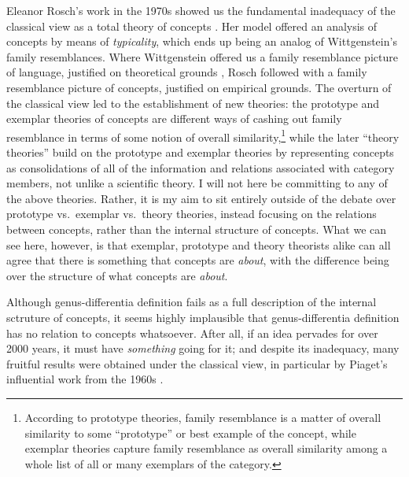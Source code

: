 \documentclass[12pt]{amsart}
\begin{document}
Eleanor Rosch's work in the 1970s showed us the fundamental inadequacy of the classical view as a total theory of concepts \cite{rosch_family_1975} \cite{rosch_structural_1976} \cite{rosch_principles_1978}. Her model offered an analysis of concepts by means of \emph{typicality}, which ends up being an analog of Wittgenstein's family resemblances. Where Wittgenstein offered us a family resemblance picture of language, justified on theoretical grounds \cite{wittgenstein_philosophical_1953}, Rosch followed with a family resemblance picture of concepts, justified on empirical grounds. The overturn of the classical view led to the establishment of new theories: the prototype and exemplar theories of concepts are different ways of cashing out family resemblance in terms of some notion of overall similarity,\footnote{According to prototype theories, family resemblance is a matter of overall similarity to some ``prototype'' or best example of the concept, while exemplar theories capture family resemblance as overall similarity among a whole list of all or many exemplars of the category.} while the later ``theory theories'' build on the prototype and exemplar theories by representing concepts as consolidations of all of the information and relations associated with category members, not unlike a scientific theory. I will not here be committing to any of the above theories. Rather, it is my aim to sit entirely outside of the debate over prototype vs.\ exemplar vs.\ theory theories, instead focusing on the relations between concepts, rather than the internal structure of concepts. What we can see here, however, is that exemplar, prototype and theory theorists alike can all agree that there is something that concepts are \emph{about}, with the difference being over the structure of what concepts are \emph{about}.

Although genus-differentia definition fails as a full description of the internal sctruture of concepts, it seems highly implausible that genus-differentia definition has no relation to concepts whatsoever. After all, if an idea pervades for over 2000 years, it must have \emph{something} going for it; and despite its inadequacy, many fruitful results were obtained under the classical view, in particular by Piaget's influential work from the 1960s \cite[pg. 15]{murphy_big_2002}.
\end{document}
